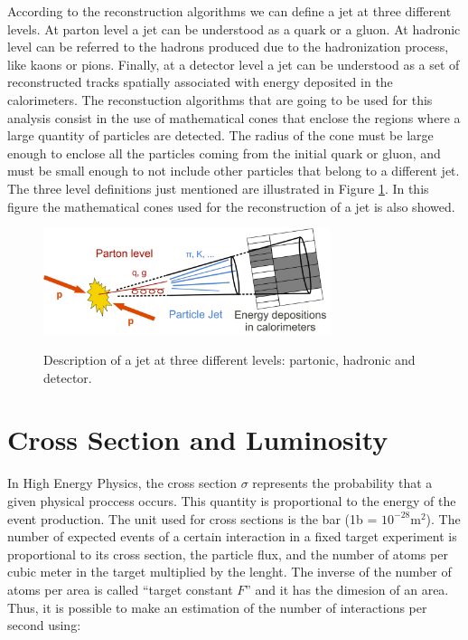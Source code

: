  According to the reconstruction algorithms we can define a jet at three different levels. At parton level a jet can be understood as a quark or a gluon. At hadronic level can be referred to the
 hadrons produced due to the hadronization process, like kaons or pions. Finally, at a detector level a jet can be understood as a set of reconstructed tracks spatially associated with energy 
 deposited in the calorimeters. The reconstuction algorithms that are going to be used for this analysis consist in the use of mathematical cones that enclose the regions where a large quantity
 of particles are 
 detected. The radius of the cone must be large enough to enclose all the particles coming from the initial quark or gluon, and must be small enough to not include other particles that belong to a 
 different jet. The three level definitions just mentioned are illustrated in Figure \ref{Jets_definitions}. In this figure the mathematical cones used for the reconstruction of a jet is also showed.
 
 
 \begin{figure}[h] 
 \centering
 \caption{Description of a jet at three different levels: partonic, hadronic and detector.}
 \includegraphics[width=0.75\textwidth]{./Capitulos/VariableDefinitions/jets_definitions}  
 \label{Jets_definitions}
 \end{figure}
 
 \section{Cross Section and Luminosity}
 
 In High Energy Physics, the cross section $\sigma$ represents the probability that a given physical proccess occurs. This quantity is proportional to the energy of the event production. The unit 
 used for cross sections is the bar (1b = $10^{-28} \text{m}^2$). The number of expected events of a certain interaction in a fixed target experiment is proportional to its cross section, the particle flux, and the
 number of atoms per cubic meter in the target multiplied by the lenght. The inverse of the number of atoms per area is called ``target constant $F$'' and it has the dimesion of an area. Thus, it 
 is possible to make an estimation of the number of interactions per second using:
 
